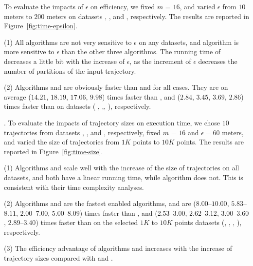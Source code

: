 To evaluate the impacts of $\epsilon$ on efficiency, we fixed $m$ = $16$,
and varied $\epsilon$  from $10$ meters to $200$ meters on
{datasets}  \sercar, \geolife, \mopsi and \pricar, respectively.
The results are reported in Figure~\ref{fig:time-epsilon}.

\ni(1) All algorithms are not very sensitive to $\epsilon$ on any datasets, and algorithm \dps is more sensitive to $\epsilon$ than the other three algorithms.
The running time of \dps decreases a little bit with the increase of $\epsilon$, as the increment of $\epsilon$ decreases the number of partitions of the input trajectory.


\ni(2) Algorithms \cist and \cista are obviously faster than \dps and \squishe for all cases.
They are on average ($14.21$, $18.19$, $17.06$, $9.98$) times faster than \dps,
and ($2.84$, $3.45$, $3.69$, $2.86$) times faster than \squishe on
{datasets} ( \sercar, {\geolife},\mopsi, \pricar), respectively.


.
To evaluate the impacts of trajectory sizes on execution time,
we chose {$10$} trajectories from {datasets}  \sercar, \geolife, \mopsi and \pricar, respectively,
fixed $m$ = $16$ and $\epsilon = 60$ meters, and varied the size  of trajectories from $1K$ points to $10K$ points.
%
The results are reported in Figure~\ref{fig:time-size}.

\ni(1) Algorithms \cist and \cista scale well with the increase of the size of trajectories on all datasets,
and both have a linear running time, while algorithm \dps does not.
This is consistent with their time complexity analyses.

\ni(2) Algorithms \cist and \cista are the fastest \sed enabled \lsa algorithms,
and are {($8.00$--$10.00$, $5.83$--$8.11$, $2.00$--$7.00$, $5.00$--$8.09$) times faster than \dps,
and {($2.53$--$3.00$, $2.62$--$3.12$, $3.00$--$3.60$, $2.89$--$3.40$)}} times faster
than \squishe  on the selected $1K$ to $10K$ points datasets (\sercar,
\geolife, \mopsi, \pricar), respectively.

\ni(3) The efficiency advantage of algorithms \cist and \cista increases with the increase of trajectory sizes compared with \dps and \squishe.



